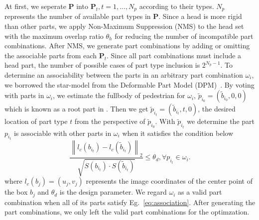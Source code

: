 \documentclass[10pt,twocolumn,letterpaper]{article}
\newcommand{\norm}[1]{\left\lVert#1\right\rVert}
\begin{document}
At first, we seperate $\mathbf{P}$ into $\mathbf{P}_t, t=1,...,N_p$ according to their types.
$N_p$ represents the number of available part types in $\mathbf{P}$.
Since a head is more rigid than other parts, we apply Non-Maximum Suppression (NMS) to the head set with the maximum overlap ratio $\theta_{h}$ for reducing the number of incompatible part combinations.
After NMS, we generate part combinations by adding or omitting the associable parts from each $\mathbf{P}_t$.
Since all part combinations must include a head part, the number of possible cases of part type inclusion is $2^{N_p-1}$.
To determine an associability between the parts in an arbitrary part combination $\omega_i$, we borrowed the star-model from the Deformable Part Model (DPM)~\cite{felzenszwalb2010object}.
By voting with parts in $\omega_i$, we estimate the fullbody of pedestrian for $\omega_i$, $\tilde{p}_{i_0} = (\tilde{b}_{i_0},0,0)$ which is known as a root part in \cite{felzenszwalb2010object}.
Then we get $\tilde{p}_{i_t} = (\tilde{b}_{i_t},t,0)$, the desired location of part type $t$ from the perspective of $\tilde{p}_{i_0}$.
With $\tilde{p}_{i_t}$ we determine the part $p_{i_t}$ is associable with other parts in $\omega_i$ when it satisfies the condition below
\begin{equation}
   \label{eq:association}
   \frac{\norm{l_c(b_{i_t}) - l_c(\tilde{b}_{i_t})}_2}{\sqrt{S(b_{i_t}) \cdot S(\tilde{b}_{i_t})}}  \leq \theta_d, \forall p_{i_t} \in \omega_i.
\end{equation}
where $l_c(b_j) = (u_j,v_j)$ represents the image coordinates of the center point of the box $b_j$ and $\theta_d$ is the design parameter.
We regard $\omega_i$ as a valid part combination when all of its parts satisfy Eg.~\ref{eq:association}.
After generating the part combinations, we only left the valid part combinations for the optimzation.
\end{document}
